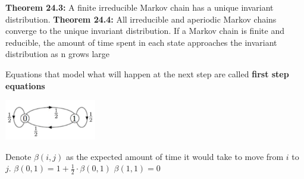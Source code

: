 {\begin{minipage}{16.3cm}
\vspace{1cm}

\textbf{Theorem 24.3:} A finite irreducible Markov chain has a unique 
invariant distribution.
\textbf{Theorem 24.4:} All irreducible and aperiodic Markov chains 
converge to the unique invariant distribution. If a Markov chain is 
finite and reducible, the amount of time spent in each state approaches 
the invariant distribution as n grows large

Equations that model what will happen at the next step are called 
\textbf{first step equations}

\vspace{5mm}

\begin{minipage}[b]{0.6\linewidth}
\begin{center}
\includegraphics[width=4cm]{definitions_markov_chain.jpg} 
\end{center}
\end{minipage}%
\hfill
\begin{minipage}[b]{0.4\linewidth}
Denote $\beta(i, j)$ as the expected amount of time it would take to 
move from $i$ to $j$.
$\beta(0, 1) = 1 + \frac{1}{2} \cdot \beta(0, 1)$
$\beta(1, 1) = 0$

\end{minipage}

\end{minipage}}